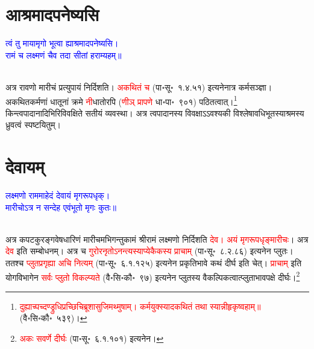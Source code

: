 \section[आश्रमादपनेष्यसि]{आश्रमादपनेष्यसि}
\centering\textcolor{blue}{त्वं तु मायामृगो भूत्वा ह्याश्रमादपनेष्यसि।\nopagebreak\\
रामं च लक्ष्मणं चैव तदा सीतां हराम्यहम्॥}\nopagebreak\\
\\
\begin{sloppypar}\justifying\noindent\hspace{10mm} अत्र रावणो मारीचं प्रत्युपायं निर्दिशति। \textcolor{red}{अकथितं च} (पा॰सू॰~१.४.५१) इत्यनेनात्र कर्म\-सञ्ज्ञा। अकथित\-कर्मणां धातूनां क्रमे \textcolor{red}{नी}\-धातोरपि (\textcolor{red}{णीञ् प्रापणे} धा॰पा॰~९०१) पठितत्वात्।\footnote{\textcolor{red}{दुह्याच्पच्दण्ड्रुधिप्रच्छिचिब्रूशासुजिमथ्मुषाम्। कर्मयुक्स्यादकथितं तथा स्यान्नीहृकृष्वहाम्॥} (वै॰सि॰कौ॰~५३९)।} किन्त्वपादानादिभिरिविवक्षिते सतीयं व्यवस्था। अत्र त्वपादानस्य विवक्षाऽऽवश्यकी विश्लेषावधि\-भूतस्याश्रमस्य ध्रुवत्वं स्पष्टयितुम्।\end{sloppypar}
\section[देवायम्]{देवायम्‌}
\centering\textcolor{blue}{लक्ष्मणो राममाहेदं देवायं मृगरूपधृक्।\nopagebreak\\
मारीचोऽत्र न सन्देह एवंभूतो मृगः कुतः॥}\nopagebreak\\
\\
\begin{sloppypar}\justifying\noindent\hspace{10mm} अत्र कपट\-कुरङ्ग\-वेष\-धारिणं मारीचमभिगन्तुकामं श्रीरामं लक्ष्मणो निर्दिशति \textcolor{red}{देव। अयं मृग\-रूप\-धृङ्मारीचः}। अत्र \textcolor{red}{देव} इति सम्बोधनम्। अत्र च \textcolor{red}{गुरोरनृतोऽनन्त्यस्याप्येकैकस्य प्राचाम्‌} (पा॰सू॰~८.२.८६) इत्यनेन प्लुतः। ततश्च \textcolor{red}{प्लुत\-प्रगृह्या अचि नित्यम्‌} (पा॰सू॰~६.१.१२५) इत्यनेन प्रकृति\-भावे कथं दीर्घ इति चेत्। \textcolor{red}{प्राचाम्‌} इति योग\-विभागेन \textcolor{red}{सर्वः प्लुतो विकल्प्यते} (वै॰सि॰कौ॰~९७) इत्यनेन प्लुतस्य वैकल्पिकत्वात्प्लुताभाव\-पक्षे दीर्घः।\footnote{\textcolor{red}{अकः सवर्णे दीर्घः} (पा॰सू॰~६.१.१०१) इत्यनेन।}\end{sloppypar}
